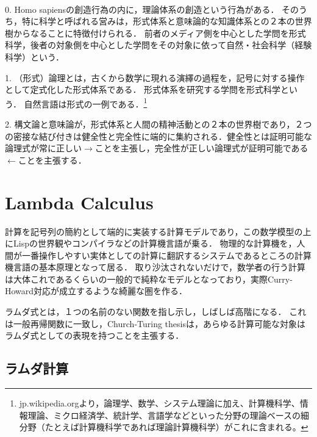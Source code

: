 \documentclass[uplatex, 12pt, dvipdfmx]{jsreport}
\begin{document}
\begin{definition}　

    0. Homo sapiensの創造行為の内に，理論体系の創造という行為がある．
    そのうち，特に科学と呼ばれる営みは，形式体系と意味論的な知識体系との２本の世界樹からなることに特徴付けられる．
    前者のメディア側を中心とした学問を形式科学，後者の対象側を中心とした学問をその対象に依って自然・社会科学（経験科学）という．

    1. （形式）論理とは，古くから数学に現れる演繹の過程を，記号に対する操作として定式化した形式体系である．
    形式体系を研究する学問を形式科学という．
    自然言語は形式の一例である．\footnote{jp.wikipedia.orgより，論理学、数学、システム理論に加え、計算機科学、情報理論、ミクロ経済学、統計学、言語学などといった分野の理論ベースの細分野（たとえば計算機科学であれば理論計算機科学）がこれに含まれる。}

    2. 構文論と意味論が，形式体系と人間の精神活動との２本の世界樹であり，２つの密接な結び付きは健全性と完全性に端的に集約される．健全性とは証明可能な論理式が常に正しい$\rightarrow$ことを主張し，完全性が正しい論理式が証明可能である$\leftarrow$ことを主張する．
\end{definition}

\section{Lambda Calculus}
計算を記号列の簡約として端的に実装する計算モデルであり，この数学模型の上にLispの世界観やコンパイラなどの計算機言語が乗る．
物理的な計算機を，人間が一番操作しやすい実体としての計算に翻訳するシステムであるところの計算機言語の基本原理となって居る．
取り沙汰されないだけで，数学者の行う計算は大体これであるくらいの一般的で純粋なモデルとなっており，実際Curry-Howard対応が成立するような綺麗な圏を作る．

ラムダ式とは，１つの名前のない関数を指し示し，しばしば高階になる．
これは一般再帰関数に一致し，Church-Turing thesisは，あらゆる計算可能な対象はラムダ式としての表現を持つことを主張する．

\subsection{ラムダ計算}
\end{document}
